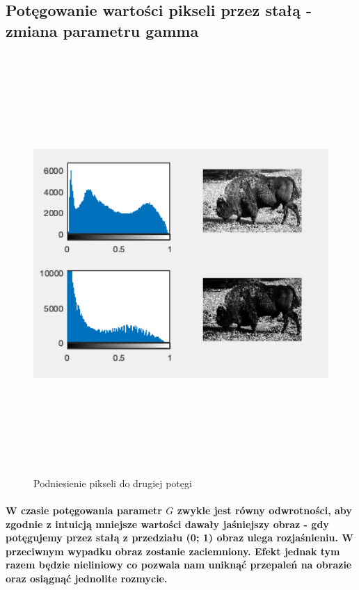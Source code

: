 \documentclass[a4paper,12pt]{article}
\begin{document}
\begin{justify}
\subsection{Potęgowanie wartości pikseli przez stałą - zmiana parametru gamma}

\begin{figure}[h!]
\centering
\includegraphics[width=18cm, height=16cm]{4}
\caption{Podniesienie pikseli do drugiej potęgi}
\end{figure}

\paragraph{W czasie potęgowania parametr $G$ zwykle jest równy odwrotności, aby zgodnie z intuicją mniejsze wartości dawały jaśniejszy obraz - gdy potęgujemy przez stałą z przedziału (0; 1) obraz ulega rozjaśnieniu. W przeciwnym wypadku obraz zostanie zaciemniony. Efekt jednak tym razem będzie nieliniowy co pozwala nam uniknąć przepaleń na obrazie oraz osiągnąć jednolite rozmycie. }

\newpage


\end{justify}
\end{document}
